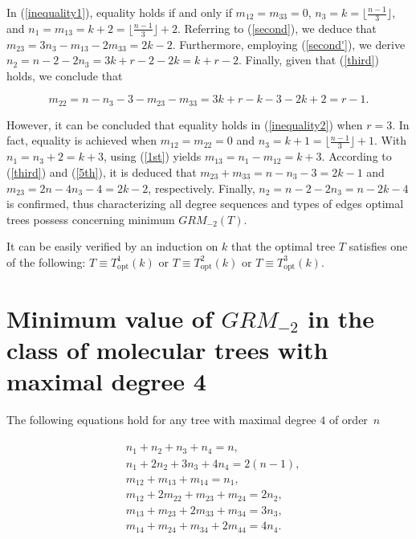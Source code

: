 \documentclass[preprint,12pt]{elsarticle}
\begin{document}
In (\ref{inequality1}), equality holds if and only if $m_{12}=m_{33}=0$, $n_3=k=\lfloor\frac{n-1}{3} \rfloor$, and $n_1=m_{13}=k+2=\lfloor \frac{n-1}{3} \rfloor+2$. Referring to (\ref{second}), we deduce that $m_{23}=3n_3-m_{13}-2m_{33}=2k-2$. Furthermore, employing (\ref{second'}), we derive $n_2=n-2-2n_3=3k+r-2-2k=k+r-2$. Finally, given that (\ref{third}) holds, we conclude that

 $$
 m_{22}=n-n_3-3-m_{23}-m_{33}=3k+r-k-3-2k+2=r-1.
 $$

However, it can be concluded that equality holds in (\ref{inequality2}) when $r=3$. In fact, equality is achieved when $m_{12}=m_{22}=0$ and $n_3=k+1= \lfloor \frac{n-1}{3} \rfloor+1$. With $n_1=n_3+2=k+3$, using (\ref{1st}) yields $m_{13}=n_1-m_{12}=k+3$. According to (\ref{third}) and (\ref{5th}), it is deduced that $m_{23}+m_{33}=n-n_3-3=2k-1$ and $m_{23}=2n-4n_3-4=2k-2$, respectively. Finally, $n_2=n-2-2n_3=n-2k-4$ is confirmed, thus characterizing all degree sequences and types of edges optimal trees possess concerning minimum $GRM_{-2}(T)$.

It can be easily verified by an induction on $k$ that the optimal tree $T$ satisfies one of the following:
$T\equiv T^1_{\text{opt}}(k)$ or $T\equiv T^2_{\text{opt}}(k)$ or $T\equiv T^3_{\text{opt}}(k)$.

\bigskip


\section{Minimum value of $GRM_{-2}$ in the class of molecular trees with  maximal degree 4}

The following equations hold for any tree with maximal degree $4$ of order~$n$ 

\begin{align}\label{sistem}
\begin{split}
    &n_1 + n_2 + n_3 + n_4 = n,\\
    &n_1 + 2n_2 + 3n_3 + 4n_4 = 2(n-1),\\
    &m_{12} + m_{13} + m_{14} = n_1,\\
    &m_{12} + 2m_{22} + m_{23} + m_{24} = 2n_2,\\
    &m_{13} + m_{23} + 2m_{33} + m_{34} = 3n_3,\\
    &m_{14} + m_{24} + m_{34} + 2m_{44} = 4n_4.\\
\end{split}
\end{align}
\end{document}

